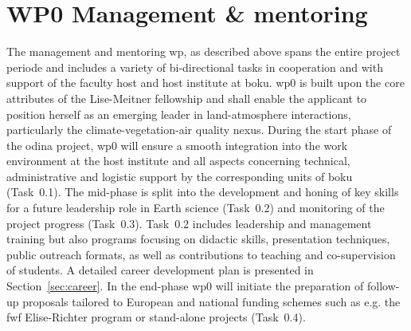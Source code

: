 \section{WP0 Management \& mentoring}
\label{sec:wp0}
The management and mentoring \gls{wp}, as described above spans the entire project periode and includes a variety of bi-directional tasks in cooperation and with support of the faculty host and host institute at \gls{boku}. \gls{wp}0 is built upon the  core attributes of the Lise-Meitner fellowship  and shall enable the applicant to position herself as an emerging leader in land-atmosphere interactions, particularly the climate-vegetation-air quality nexus. During the start phase of the \gls{odina} project, \gls{wp}0 will ensure a smooth integration into the work environment at the host institute  and all aspects concerning technical, administrative and logistic support by the corresponding units of \gls{boku} (Task~0.1). The mid-phase is split into the development and honing of key skills for a future leadership role in Earth science (Task~0.2) and monitoring of the project progress (Task~0.3). Task~0.2 includes leadership and management training but also programs focusing on didactic skills, presentation techniques, public outreach formats, as well as contributions to  teaching and co-supervision of students. A detailed career development plan is presented in Section~\ref{sec:career}. In the end-phase \gls{wp}0 will initiate the preparation of follow-up proposals tailored to European and national funding schemes such as e.g. the \gls{fwf} Elise-Richter program or stand-alone projects (Task~0.4).


